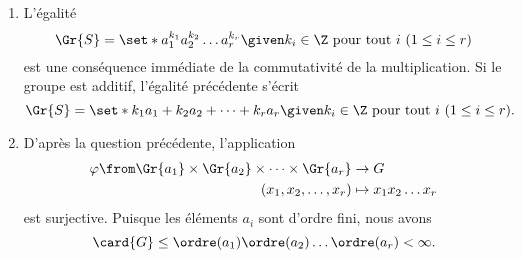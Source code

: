 \begin{enumerate}
  \item 
    L'égalité
    \[
      \Gr{S} = \set*{ a_1^{k_1} a_2^{k_2}\dots a_r^{k_r} \given k_i\in\Z\text{ pour tout $i$ $(1\leq i\leq r)$}}
    \]
    est une conséquence immédiate de la commutativité de la multiplication.    
    Si le groupe est additif, l'égalité précédente s'écrit
    \[
      \Gr{S} = \set*{ k_1a_1 + k_2a_2 + \dots + k_ra_r \given k_i\in\Z\text{ pour tout $i$ $(1\leq i\leq r)$}}.
    \]

  \item
    D'après la question précédente, l'application
    \begin{align*}
      \varphi \from \Gr{a_1}\times\Gr{a_2}\times\dots\times\Gr{a_r} &\to G \\
      (x_1,x_2,\dots,x_r) &\mapsto x_1x_2\dots x_r
    \end{align*}
    est surjective.
    Puisque les éléments $a_i$ sont d'ordre fini, nous avons  
    \[
      \card{G}\leq \ordre(a_1)\ordre(a_2)\dots\ordre(a_r) < \infty.
    \]
\end{enumerate}
